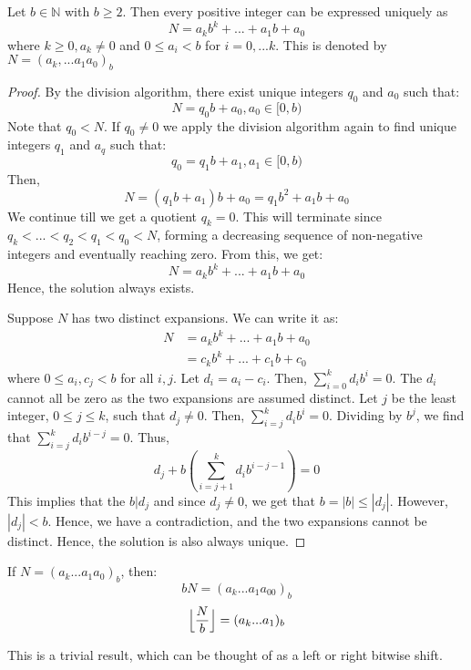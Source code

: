 \documentclass[12pt,letterpaper]{amsbook}
\theoremstyle{definition}
\newcommand{\N}{\mathbb{N}}
\begin{document}
\phantom{}

\begin{theorem}
  Let $b \in \N$   with $b \geq 2$. Then every positive integer can be expressed uniquely as 
  \[N = a_kb^k + ...+a_1b+a_0\]
  where $k \geq 0, a_k \neq 0$ and $0 \leq a_i < b$ for $i = 0,...k$. This is denoted by $N = (a_k,...a_1a_0)_b$
\end{theorem}

\begin{proof}
  By the division algorithm, there exist unique integers $q_0$ and $a_0$ such that:
  \[N = q_0b + a_0, a_0 \in [0,b)\]
  Note that $q_0 < N$. If $q_0 \neq 0$ we apply the division algorithm again to find unique integers $q_1$ and $a_q$ such that:
  \[q_0 = q_1b + a_1, a_1 \in [0,b)\]
  Then,
  \[N = (q_1b+a_1)b+a_0 = q_1b^2 + a_1b + a_0\]
  We continue till we get a quotient $q_k = 0$. This will terminate since $q_k < ... < q_2 < q_1 < q_0 < N$, forming a decreasing sequence of non-negative integers and eventually reaching zero. From this, we get:
  \[N = a_kb^k + ... + a_1b + a_0\]
  Hence, the solution always exists.

  Suppose $N$ has two distinct expansions. We can write it as:
  \begin{align*}
    N &= a_kb^k + ... + a_1b + a_0 \\
      &= c_kb^k + ... + c_1b + c_0
  \end{align*}
  where $0 \leq a_i,c_j < b$ for all $i,j$. Let $d_i = a_i-c_i$. Then, $\sum_{i=0}^k d_ib^i = 0$. The $d_i$ cannot all be zero as the two expansions are assumed distinct. Let $j$ be the least integer, $0 \leq j \leq k$, such that $d_j \neq 0$. Then, $\sum_{i=j}^k d_ib^i = 0$. Dividing by $b^j$, we find that $\sum_{i=j}^k d_ib^{i-j} = 0$. Thus,
  \[d_j + b \left( \sum_{i = j+1}^{k} d_i b^{i-j-1} \right) = 0\]
  This implies that the $b | d_j$ and since $d_j \neq 0$, we get that $b = |b| \leq |d_j|$. However, $|d_j| < b$. Hence, we have a contradiction, and the two expansions cannot be distinct.
  Hence, the solution is also always unique.
\end{proof}

\begin{lemma}
  If $N = (a_k...a_1a_0)_b$, then:
  \[bN = (a_k...a_1a_00)_b\]
  \[\Bigl \lfloor \frac{N}{b} \Bigr \rfloor = (a_k...a_1)_b\]
\end{lemma}

This is a trivial result, which can be thought of as a left or right bitwise shift.
\end{document}
